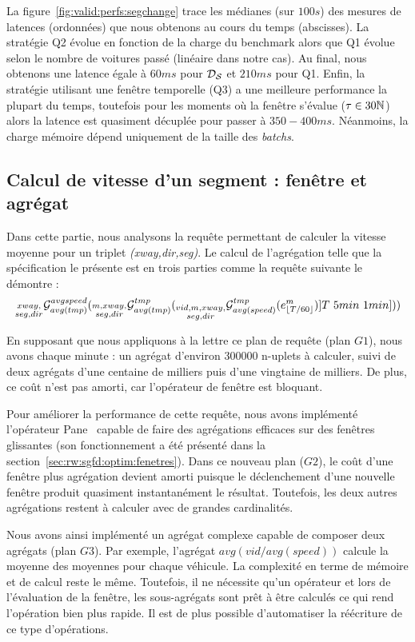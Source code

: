 La figure~\ref{fig:valid:perfs:segchange} trace les médianes (sur $100s$) des mesures de latences (ordonnées) que nous obtenons au cours du temps (abscisses). La stratégie Q2 évolue en fonction de la charge du benchmark alors que Q1 évolue selon le nombre de voitures passé (linéaire dans notre cas). Au final, nous obtenons une latence égale à $60ms$ pour $\mathcal{D_S}$ et $210ms$ pour Q1. Enfin, la stratégie utilisant une fenêtre temporelle (Q3) a une meilleure performance la plupart du temps, toutefois pour les moments où la fenêtre s'évalue ($\tau\in 30\mathbb{N}$) alors la latence est quasiment décuplée pour passer à $350-400ms$. Néanmoins, la charge mémoire dépend uniquement de la taille des \textit{batchs}.

\subsection{Calcul de vitesse d'un segment : fenêtre et agrégat}
Dans cette partie, nous analysons la requête permettant de calculer la vitesse moyenne pour un triplet \textit{(xway,dir,seg)}. Le calcul de l'agrégation telle que la spécification le présente est en trois parties comme la requête suivante le démontre :
$$\null_{\substack{xway,\\ seg,dir}}\G_{avg(tmp)}^{avgspeed}(\null_{\substack{m,xway,\\ seg,dir}}\G_{avg(tmp)}^{tmp}(\null_{\substack{vid,m,xway,\\ seg,dir}}\G_{avg(speed)}^{tmp} (e_{\lfloor T/60 \rfloor}^{m})]T\ 5min\ 1min]))$$

En supposant que nous appliquons à la lettre ce plan de requête (plan $G1$), nous avons chaque minute : un agrégat d'environ 300000 n-uplets à calculer, suivi de deux agrégats d'une centaine de milliers puis d'une vingtaine de milliers. De plus, ce coût n'est pas amorti, car l'opérateur de fenêtre est bloquant.

Pour améliorer la performance de cette requête, nous avons implémenté l'opérateur Pane~\cite{Li:pane} capable de faire des agrégations efficaces sur des fenêtres glissantes (son fonctionnement a été présenté dans la section~\ref{sec:rw:sgfd:optim:fenetres}). Dans ce nouveau plan ($G2$), le coût d'une fenêtre plus agrégation devient amorti puisque le déclenchement d'une nouvelle fenêtre produit quasiment instantanément le résultat. Toutefois, les deux autres agrégations restent à calculer avec de grandes cardinalités.

Nous avons ainsi implémenté un agrégat complexe capable de composer deux agrégats (plan $G3$). Par exemple, l'agrégat $avg(vid/avg(speed))$ calcule la moyenne des moyennes pour chaque véhicule. La complexité en terme de mémoire et de calcul reste le même. Toutefois, il ne nécessite qu'un opérateur et lors de l'évaluation de la fenêtre, les sous-agrégats sont prêt à être calculés ce qui rend l'opération bien plus rapide. Il est de plus possible d'automatiser la réécriture de ce type d'opérations.

